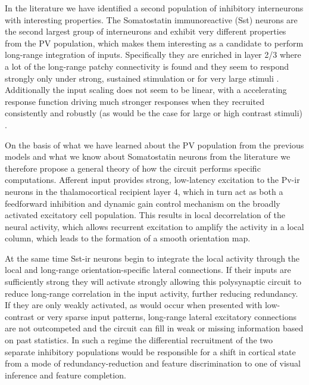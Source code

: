 In the literature we have identified a second population of inhibitory
interneurons with interesting properties. The Somatostatin
immunoreactive (Sst) neurons are the second largest group of
interneurons \citep{Gonchar2007,Xu2010} and exhibit very different
properties from the PV population, which makes them interesting as a
candidate to perform long-range integration of inputs. Specifically
they are enriched in layer 2/3 where a lot of the long-range patchy
connectivity is found and they seem to respond strongly only under
strong, sustained stimulation \citep{Ma2011} or for very large stimuli
\citep{Adesnik2012}. Additionally the input scaling does not seem to
be linear, with a accelerating response function driving much stronger
responses when they recruited consistently and robustly (as would be
the case for large or high contrast stimuli)
\citep{Beierlein2003,Bartley2008,Tan2008}.

On the basis of what we have learned about the PV population from the
previous models and what we know about Somatostatin neurons from the
literature we therefore propose a general theory of how the circuit
performs specific computations. Afferent input provides strong,
low-latency excitation to the Pv-ir neurons in the thalamocortical
recipient layer 4, which in turn act as both a feedforward inhibition
and dynamic gain control mechanism on the broadly activated excitatory
cell population. This results in local decorrelation of the neural
activity, which allows recurrent excitation to amplify the activity in
a local column, which leads to the formation of a smooth orientation
map.

At the same time Sst-ir neurons begin to integrate the local activity
through the local and long-range orientation-specific lateral
connections. If their inputs are sufficiently strong they will
activate strongly allowing this polysynaptic circuit to reduce
long-range correlation in the input activity, further reducing
redundancy. If they are only weakly activated, as would occur when
presented with low-contrast or very sparse input patterns, long-range
lateral excitatory connections are not outcompeted and the circuit can
fill in weak or missing information based on past statistics. In such
a regime the differential recruitment of the two separate inhibitory
populations would be responsible for a shift in cortical state from a
mode of redundancy-reduction and feature discrimination to one of
visual inference and feature completion.

